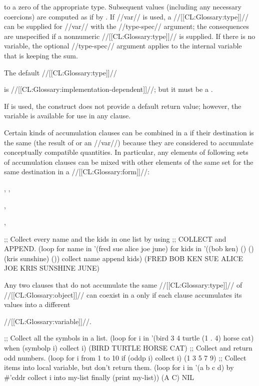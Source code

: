 to a zero of the appropriate type. Subsequent values (including any necessary coercions) are computed as if by \thefunction{+}. If  //var// is used, a //[[CL:Glossary:type]]// can be supplied for //var// with the //type-spec// argument; the consequences are unspecified if a nonnumeric //[[CL:Glossary:type]]// is supplied.            If there is no  variable, the optional //type-spec// argument applies to the internal variable that is keeping the sum.

The default //[[CL:Glossary:type]]//

is //[[CL:Glossary:implementation-dependent]]//; but it must be a .
 

If  is used, the construct does not provide a default return value; however, the variable is available for use in any  clause.  
     

 

Certain kinds of accumulation clauses can be combined in a   if their destination is the same  (the result of  or an  //var//)  because they are considered to accumulate conceptually compatible quantities. In particular,  any elements of following sets of accumulation clauses can be mixed with other elements of the same set for the same destination  in a  //[[CL:Glossary:form]]//:

\beginlist \itemitem{\bull} , , 

\itemitem{\bull} , 

\itemitem{\bull} ,  \endlist

\code ;; Collect every name and the kids in one list by using  ;; COLLECT and APPEND.
 (loop for name in '(fred sue alice joe june)
       for kids in '((bob ken) () () (kris sunshine) ())
       collect name
       append kids) \EV (FRED BOB KEN SUE ALICE JOE KRIS SUNSHINE JUNE) \endcode
 

Any two clauses that do not accumulate the same //[[CL:Glossary:type]]// of  //[[CL:Glossary:object]]//  can coexist in a  only  if each clause accumulates its values into  a different

//[[CL:Glossary:variable]]//.  


\code ;; Collect all the symbols in a list.
 (loop for i in '(bird 3 4 turtle (1 . 4) horse cat)
       when (symbolp i) collect i) \EV (BIRD TURTLE HORSE CAT)
  ;; Collect and return odd numbers.
 (loop for i from 1 to 10
       if (oddp i) collect i) \EV (1 3 5 7 9)
  ;; Collect items into local variable, but don't return them.
 (loop for i in '(a b c d) by #'cddr
       collect i into my-list
       finally (print my-list)) \OUT (A C)  \EV NIL \endcode
  \endsubsubsection%

